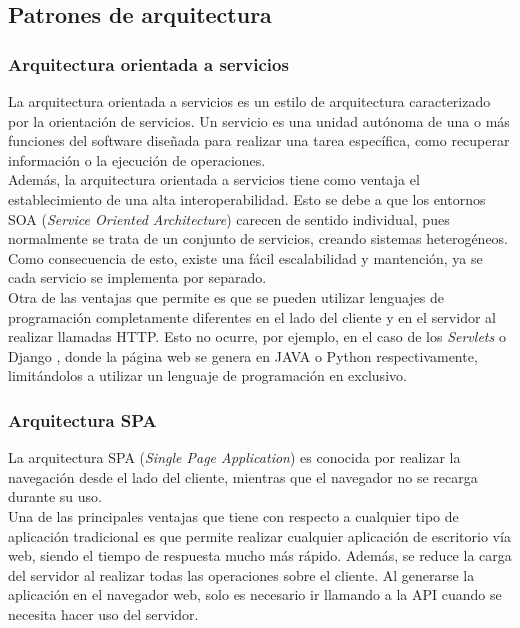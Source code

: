 \subsection{Patrones de arquitectura}

\subsubsection{Arquitectura orientada a servicios}

La arquitectura orientada a servicios \cite{soa} es un estilo de arquitectura caracterizado por la orientación de servicios. Un servicio es una unidad autónoma de una o más funciones del software diseñada para realizar una tarea específica, como recuperar información o la ejecución de operaciones.
\\

Además, la arquitectura orientada a servicios tiene como ventaja el establecimiento de una alta interoperabilidad. Esto se debe a que los entornos SOA ({\it Service Oriented Architecture}) carecen de sentido individual, pues normalmente se trata de un conjunto de servicios, creando sistemas heterogéneos. Como consecuencia de esto, existe una fácil escalabilidad y mantención, ya se cada servicio se implementa por separado.
\\

Otra de las ventajas que permite es que se pueden utilizar lenguajes de programación completamente diferentes en el lado del cliente y en el servidor al realizar llamadas HTTP. Esto no ocurre, por ejemplo, en el caso de los {\it Servlets} \cite{servlet} o Django \cite{django}, donde la página web se genera en JAVA o Python respectivamente, limitándolos a utilizar un lenguaje de programación en exclusivo.

\subsubsection{Arquitectura SPA}

La arquitectura SPA ({\it Single Page Application}) \cite{spa} es conocida por realizar la navegación desde el lado del cliente, mientras que el navegador no se recarga durante su uso. 
\\

Una de las principales ventajas que tiene con respecto a cualquier tipo de aplicación tradicional es que permite realizar cualquier aplicación de escritorio vía web, siendo el tiempo de respuesta mucho más rápido. Además, se reduce la carga del servidor al realizar todas las operaciones sobre el cliente. Al generarse la aplicación en el navegador web, solo es necesario ir llamando a la API cuando se necesita hacer uso del servidor.